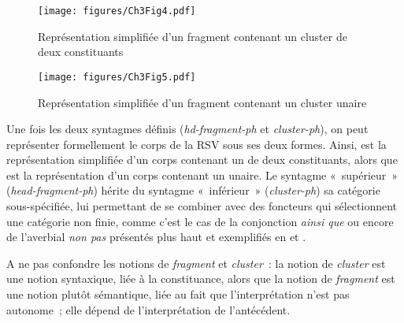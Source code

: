 \largerpage[-2]
\begin{figure}
\texttt{[image: figures/Ch3Fig4.pdf]}  
\caption{Représentation simplifiée d’un fragment contenant un cluster de deux constituants}
\label{ch3:fig4}
\end{figure}

\begin{figure}
\texttt{[image: figures/Ch3Fig5.pdf]} 
\caption{Représentation simplifiée d’un fragment contenant un cluster unaire}
\label{ch3:fig5}
\end{figure}

Une fois les deux syntagmes définis (\textit{hd-fragment-ph} et \textit{cluster-ph}), on peut représenter formellement le corps de la RSV sous ses deux formes. Ainsi,  est la représentation simplifiée d’un corps contenant un  de deux constituants, alors que  est la représentation d’un corps contenant un  unaire. Le syntagme «~supérieur~» (\textit{head-fragment-ph}) hérite du syntagme «~inférieur~» (\textit{cluster-ph}) sa catégorie sous-spécifiée, lui permettant de se combiner avec des foncteurs qui sélectionnent une catégorie non finie, comme c’est le cas de la conjonction \textit{ainsi que} ou encore de l’averbial \textit{non pas} présentés plus haut et exemplifiés en  et .




A ne pas confondre les notions de \textit{fragment} et \textit{cluster~}: la notion de \textit{cluster} est une notion syntaxique, liée à la constituance, alors que la notion de \textit{fragment} est une notion plutôt sémantique, liée au fait que l’interprétation n’est pas autonome~; elle dépend de l’interprétation de l’antécédent.



